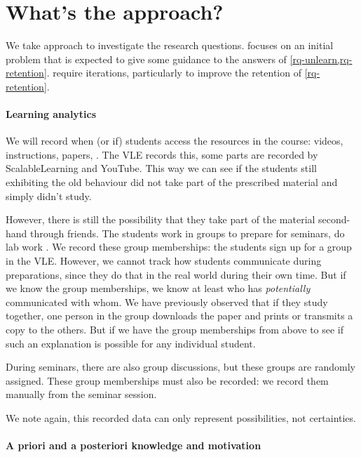 \section{What's the approach?}

We take  approach to investigate the research questions.
 focuses on an initial problem that is expected to give some 
guidance to the answers of \cref{rq-unlearn,rq-retention}.
 require iterations, particularly to improve the 
retention of \cref{rq-retention}.

\paragraph{Learning analytics}

We will record when (or if) students access the resources in the course:
videos,
instructions,
papers,
\etc.
The \ac{VLE} records this, some parts are recorded by ScalableLearning and 
YouTube.
This way we can see if the students still exhibiting the old behaviour did not 
take part of the prescribed material and simply didn't study.

However, there is still the possibility that they take part of the material 
second-hand through friends.
The students work in groups to prepare for seminars, do lab work \etc.
We record these group memberships: the students sign up for a group in the 
\ac{VLE}.
However, we cannot track how students communicate during preparations, since 
they do that in the real world during their own time.
But if we know the group memberships, we know at least who has 
\emph{potentially} communicated with whom.
We have previously observed that if they study together, one person in the 
group downloads the paper and prints or transmits a copy to the others.
But if we have the group memberships from above to see if such an explanation 
is possible for any individual student.

During seminars, there are also group discussions, but these groups are 
randomly assigned.
These group memberships must also be recorded: we record them manually from the 
seminar session.

We note again, this recorded data can only represent possibilities, not 
certainties.

\paragraph{A priori and a posteriori knowledge and motivation}

